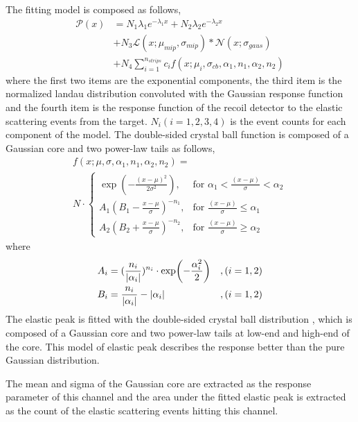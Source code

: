 \documentclass[number,5p]{elsarticle}
\begin{document}
The fitting model is composed as follows,
\begin{equation}
\begin{aligned}
\mathcal{P}(x) &= N_{1}\lambda_1e^{-\lambda_{1}x}+N_{2}\lambda_2e^{-\lambda_{2}x}\\
&+N_{3}\mathcal{L}(x;\mu_{mip},\sigma_{mip})\ast\mathcal{N}(x;\sigma_{gaus})\\
&+N_{4}\sum_{i=1}^{n_{strips}}{c_{i}f(x;\mu_{i},\sigma_{cb},\alpha_1,n_1,\alpha_2,n_2)}
\end{aligned}
\end{equation}
where the first two items are the exponential components, the third item is the
normalized landau distribution convoluted with the Gaussian response function
and the fourth item is the response function of the recoil detector to the
elastic scattering events from the target.
$N_i (i=1,2,3,4)$ is the event counts for each component of the model.
The double-sided crystal ball function is composed of a Gaussian core and two
power-law tails as follows,
\begin{multline}
  f(x;\mu,\sigma,\alpha_1,n_1,\alpha_2,n_2) = \\
  N\cdot
  \begin{cases}
    \exp(-\frac{(x-\mu)^2}{2\sigma^2}), &\text{for } \alpha_1 < \frac{(x-\mu)}{\sigma} < \alpha_2\\
    A_1(B_1-\frac{x-\mu}{\sigma})^{-n_1}, &\text{for } \frac{(x-\mu)}{\sigma} \leqslant \alpha_1\\
	    A_2(B_2+\frac{x-\mu}{\sigma})^{-n_2}, &\text{for } \frac{(x-\mu)}{\sigma} \geqslant \alpha_2
  \end{cases} 
\end{multline}
where
\begin{align}
  A_i &= (\frac{n_i}{\abs{\alpha_i}})^{n_i}\cdot\exp(-\frac{\alpha_i^2}{2}) &,(i=1,2)\\
  B_i &= \frac{n_i}{\abs{\alpha_i}} - \abs{\alpha_i} &,(i=1,2)
\end{align}
The elastic peak is fitted with the double-sided
crystal ball distribution \cite{crystal_ball}, which is composed of a Gaussian core and two
power-law tails at low-end and high-end of the core.
This model of elastic peak describes the response better than the pure Gaussian distribution.

The mean and sigma of the Gaussian core are extracted as the response parameter
of this channel and the area under the fitted elastic peak is extracted as
the count of the elastic scattering events hitting this channel.
\end{document}
